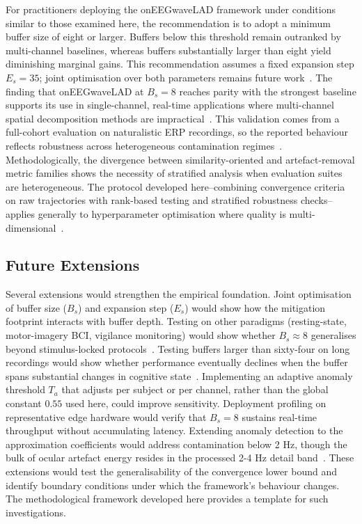 \documentclass[MScCS,12pt,oneside,final]{uccthesis}
\begin{document}
For practitioners deploying the onEEGwaveLAD framework under conditions similar to those examined here, the recommendation is to adopt a minimum buffer size of eight or larger. Buffers below this threshold remain outranked by multi-channel baselines, whereas buffers substantially larger than eight yield diminishing marginal gains. This recommendation assumes a fixed expansion step $E_s = 35$; joint optimisation over both parameters remains future work~\parencite{longo2025oneegwavelad}. The finding that onEEGwaveLAD at $B_s = 8$ reaches parity with the strongest baseline supports its use in single-channel, real-time applications where multi-channel spatial decomposition methods are impractical~\parencite{makeig1996independent, mullen2015real}. This validation comes from a full-cohort evaluation on naturalistic ERP recordings, so the reported behaviour reflects robustness across heterogeneous contamination regimes~\parencite{kappenman2021erp}. Methodologically, the divergence between similarity-oriented and artefact-removal metric families shows the necessity of stratified analysis when evaluation suites are heterogeneous. The protocol developed here--combining convergence criteria on raw trajectories with rank-based testing and stratified robustness checks--applies generally to hyperparameter optimisation where quality is multi-dimensional~\parencite{friedman1937use}.

\subsection{Future Extensions}

Several extensions would strengthen the empirical foundation. Joint optimisation of buffer size ($B_s$) and expansion step ($E_s$) would show how the mitigation footprint interacts with buffer depth. Testing on other paradigms (resting-state, motor-imagery BCI, vigilance monitoring) would show whether $B_s \approx 8$ generalises beyond stimulus-locked protocols~\parencite{kappenman2021erp}. Testing buffers larger than sixty-four on long recordings would show whether performance eventually declines when the buffer spans substantial changes in cognitive state~\parencite{gama2014survey}. Implementing an adaptive anomaly threshold $T_a$ that adjusts per subject or per channel, rather than the global constant $0.55$ used here, could improve sensitivity. Deployment profiling on representative edge hardware would verify that $B_s = 8$ sustains real-time throughput without accumulating latency. Extending anomaly detection to the approximation coefficients would address contamination below 2 Hz, though the bulk of ocular artefact energy resides in the processed 2-4 Hz detail band~\parencite{longo2025oneegwavelad}. These extensions would test the generalisability of the convergence lower bound and identify boundary conditions under which the framework's behaviour changes. The methodological framework developed here provides a template for such investigations.
\end{document}
